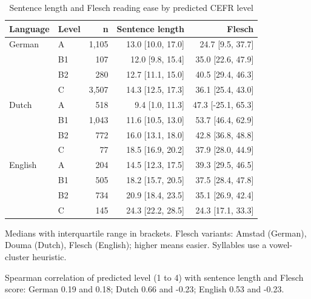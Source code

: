 \begin{table}[htbp]
\centering
\small
\begin{threeparttable}
\caption{Sentence length and Flesch reading ease by predicted CEFR level}
\label{tab:readability-by-level}
\begin{tabular}{llrrr}
\hline
Language & Level & n & Sentence length & Flesch \\
\hline
German & A & 1,105 & 13.0 [10.0, 17.0] & 24.7 [9.5, 37.7] \\
 & B1 & 107 & 12.0 [9.8, 15.4] & 35.0 [22.6, 47.9] \\
 & B2 & 280 & 12.7 [11.1, 15.0] & 40.5 [29.4, 46.3] \\
 & C & 3,507 & 14.3 [12.5, 17.3] & 36.1 [25.4, 43.0] \\
\hline
Dutch & A & 518 & 9.4 [1.0, 11.3] & 47.3 [-25.1, 65.3] \\
 & B1 & 1,043 & 11.6 [10.5, 13.0] & 53.7 [46.4, 62.9] \\
 & B2 & 772 & 16.0 [13.1, 18.0] & 42.8 [36.8, 48.8] \\
 & C & 77 & 18.5 [16.9, 20.2] & 37.9 [28.0, 44.9] \\
\hline
English & A & 204 & 14.5 [12.3, 17.5] & 39.3 [29.5, 46.5] \\
 & B1 & 505 & 18.2 [15.7, 20.5] & 37.5 [28.4, 47.8] \\
 & B2 & 734 & 20.9 [18.4, 23.5] & 35.1 [26.9, 42.4] \\
 & C & 145 & 24.3 [22.2, 28.5] & 24.3 [17.1, 33.3] \\
\hline
\end{tabular}
\begin{tablenotes}
\footnotesize
\item Medians with interquartile range in brackets. Flesch variants: Amstad (German), Douma (Dutch), Flesch (English); higher means easier. Syllables use a vowel-cluster heuristic.
\item Spearman correlation of predicted level (1 to 4) with sentence length and Flesch score: German 0.19 and 0.18; Dutch 0.66 and -0.23; English 0.53 and -0.23.
\end{tablenotes}
\end{threeparttable}
\end{table}
